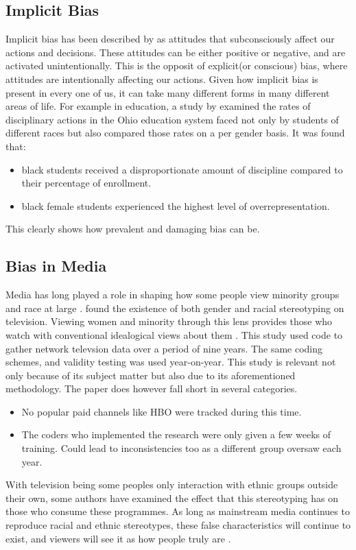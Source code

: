 \documentclass[oneside,12pt]{Classes/RoboticsLaTeX}
\begin{document}
\subsection{Implicit Bias}
Implicit bias has been described by \citet{imp_bias} as attitudes that subconsciously affect our actions and decisions. These attitudes can be either
positive or negative, and are activated unintentionally. This is the opposit of explicit(or conscious) bias, where attitudes are intentionally affecting our
actions. Given how implicit bias is present in every one of us, it can take many different forms in many different areas of life. For example in education, 
a study by \citet{WrightRobin} examined the rates of disciplinary actions in the Ohio education system faced not only by students of different races but also compared those rates on a per gender 
basis. It was found that:
\begin{itemize}
  \item black students received a disproportionate amount of discipline compared to their percentage of enrollment.
  \item black female students experienced the highest level of overrepresentation.
\end{itemize}
This clearly shows how prevalent and damaging bias can be.
\subsection{Bias in Media}
Media has long played a role in shaping how some people view minority groups and race at large \citep{Greenberg2002Minorities}.
\citet{mediastudy} found the existence of both gender and racial stereotyping on television. Viewing women and minority
through this lens provides those who watch with conventional idealogical views about them \citep{mediastudy}. This study used code
to gather network televsion data over a period of nine years. The same coding schemes, and validity testing was used year-on-year. 
This study is relevant not only because of its subject matter but also due to its aforementioned methodology. The paper does however
fall short in several categories.
\begin{itemize}
  \item No popular paid channels like HBO were tracked during this time.
  \item The coders who implemented the research were only given a few weeks of training. Could lead to inconsistencies too as a different group oversaw each year.
\end{itemize}
With television being some peoples only interaction with ethnic groups outside their own, some authors have examined the effect that this stereotyping has on those who consume these programmes. 
As long as mainstream media continues to reproduce racial and ethnic stereotypes, these false characteristics will continue to exist, and viewers will see it as 
how people truly are \citep{Castaneda}.
\end{document}
